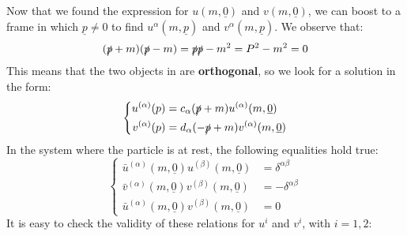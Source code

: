 \documentclass[../main.tex]{subfiles}
\begin{document}
Now that we found the expression for $u(m,\underline{0})$ and $v(m,\underline{0})$, we can boost to a frame in which $\underline{p}\neq0$ to find $u^\alpha(m,\underline{p})$ and $v^\alpha(m,\underline{p})$. We observe that: 
\[
(\slashed{p}+m)(\slashed{p}-m)=\slashed{p}\slashed{p}-m^2=P^2-m^2=0
\]
This means that the two objects in  are \textbf{orthogonal}, so we look for a solution in the form:
\[
\left\{
\begin{aligned}
u^{(\alpha)}(p)&=c_\alpha(\slashed{p}+m)u^{(\alpha)}(m,\underline{0})\\
v^{(\alpha)}(p)&=d_\alpha(-\slashed{p}+m)v^{(\alpha)}(m,\underline{0})
\end{aligned}
\right.
\]
In the system where the particle is at rest, the following equalities hold true:
\[
\left\{
\begin{aligned}
\bar{u}^{(\alpha)}(m,\underline{0})u^{(\beta)}(m,\underline{0})&=\delta^{\alpha\beta}\\
\bar{v}^{(\alpha)}(m,\underline{0})v^{(\beta)}(m,\underline{0})&=-\delta^{\alpha\beta}\\
\bar{u}^{(\alpha)}(m,\underline{0})v^{(\beta)}(m,\underline{0})&=0
\end{aligned}
\right.
\]
It is easy to check the validity of these relations for $u^i$ and $v^i$, with $i=1,2$:
\end{document}
